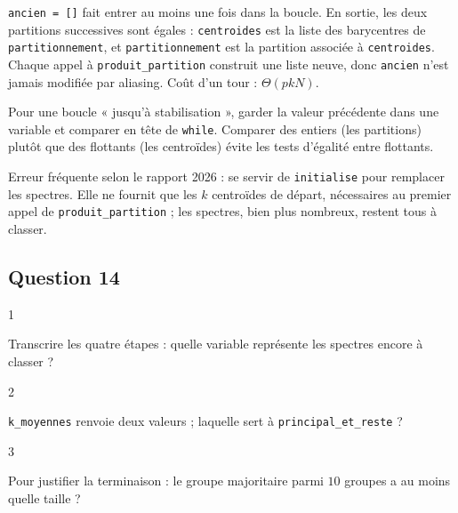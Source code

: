 \documentclass[11pt,a4paper]{article}
\begin{document}
\texttt{ancien\ =\ {[}{]}} fait entrer au moins une fois dans la boucle. En sortie, les deux partitions successives sont égales : \texttt{centroides} est la liste des barycentres de \texttt{partitionnement}, et \texttt{partitionnement} est la partition associée à \texttt{centroides}. Chaque appel à \texttt{produit\_partition} construit une liste neuve, donc \texttt{ancien} n'est jamais modifiée par aliasing. Coût d'un tour : \(\Theta(pkN)\).

\begin{methode}

Pour une boucle « jusqu'à stabilisation », garder la valeur précédente dans une variable et comparer en tête de \texttt{while}. Comparer des entiers (les partitions) plutôt que des flottants (les centroïdes) évite les tests d'égalité entre flottants.

\end{methode}

\begin{piege}

Erreur fréquente selon le rapport 2026 : se servir de \texttt{initialise} pour remplacer les spectres. Elle ne fournit que les \(k\) centroïdes de départ, nécessaires au premier appel de \texttt{produit\_partition} ; les spectres, bien plus nombreux, restent tous à classer.

\end{piege}

\hypertarget{question-14}{%
\subsection{Question 14}\label{question-14}}

\begin{indication}{1}

Transcrire les quatre étapes : quelle variable représente les spectres encore à classer ?

\end{indication}

\begin{indication}{2}

\texttt{k\_moyennes} renvoie deux valeurs ; laquelle sert à \texttt{principal\_et\_reste} ?

\end{indication}

\begin{indication}{3}

Pour justifier la terminaison : le groupe majoritaire parmi \(10\) groupes a au moins quelle taille ?

\end{indication}
\end{document}
